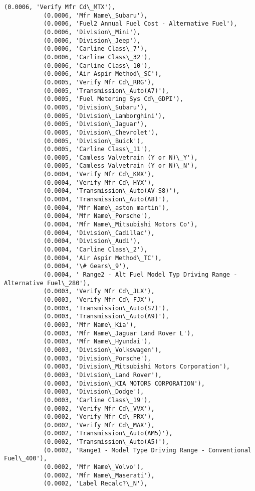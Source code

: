 \documentclass[11pt]{article}
\begin{document}
\begin{Verbatim}[commandchars=\\\{\}]
           (0.0006, 'Verify Mfr Cd\_MTX'),
           (0.0006, 'Mfr Name\_Subaru'),
           (0.0006, 'Fuel2 Annual Fuel Cost - Alternative Fuel'),
           (0.0006, 'Division\_Mini'),
           (0.0006, 'Division\_Jeep'),
           (0.0006, 'Carline Class\_7'),
           (0.0006, 'Carline Class\_32'),
           (0.0006, 'Carline Class\_10'),
           (0.0006, 'Air Aspir Method\_SC'),
           (0.0005, 'Verify Mfr Cd\_RRG'),
           (0.0005, 'Transmission\_Auto(A7)'),
           (0.0005, 'Fuel Metering Sys Cd\_GDPI'),
           (0.0005, 'Division\_Subaru'),
           (0.0005, 'Division\_Lamborghini'),
           (0.0005, 'Division\_Jaguar'),
           (0.0005, 'Division\_Chevrolet'),
           (0.0005, 'Division\_Buick'),
           (0.0005, 'Carline Class\_11'),
           (0.0005, 'Camless Valvetrain (Y or N)\_Y'),
           (0.0005, 'Camless Valvetrain (Y or N)\_N'),
           (0.0004, 'Verify Mfr Cd\_KMX'),
           (0.0004, 'Verify Mfr Cd\_HYX'),
           (0.0004, 'Transmission\_Auto(AV-S8)'),
           (0.0004, 'Transmission\_Auto(A8)'),
           (0.0004, 'Mfr Name\_aston martin'),
           (0.0004, 'Mfr Name\_Porsche'),
           (0.0004, 'Mfr Name\_Mitsubishi Motors Co'),
           (0.0004, 'Division\_Cadillac'),
           (0.0004, 'Division\_Audi'),
           (0.0004, 'Carline Class\_2'),
           (0.0004, 'Air Aspir Method\_TC'),
           (0.0004, '\# Gears\_9'),
           (0.0004, ' Range2 - Alt Fuel Model Typ Driving Range - Alternative Fuel\_280'),
           (0.0003, 'Verify Mfr Cd\_JLX'),
           (0.0003, 'Verify Mfr Cd\_FJX'),
           (0.0003, 'Transmission\_Auto(S7)'),
           (0.0003, 'Transmission\_Auto(A9)'),
           (0.0003, 'Mfr Name\_Kia'),
           (0.0003, 'Mfr Name\_Jaguar Land Rover L'),
           (0.0003, 'Mfr Name\_Hyundai'),
           (0.0003, 'Division\_Volkswagen'),
           (0.0003, 'Division\_Porsche'),
           (0.0003, 'Division\_Mitsubishi Motors Corporation'),
           (0.0003, 'Division\_Land Rover'),
           (0.0003, 'Division\_KIA MOTORS CORPORATION'),
           (0.0003, 'Division\_Dodge'),
           (0.0003, 'Carline Class\_19'),
           (0.0002, 'Verify Mfr Cd\_VVX'),
           (0.0002, 'Verify Mfr Cd\_PRX'),
           (0.0002, 'Verify Mfr Cd\_MAX'),
           (0.0002, 'Transmission\_Auto(AM5)'),
           (0.0002, 'Transmission\_Auto(A5)'),
           (0.0002, 'Range1 - Model Type Driving Range - Conventional Fuel\_400'),
           (0.0002, 'Mfr Name\_Volvo'),
           (0.0002, 'Mfr Name\_Maserati'),
           (0.0002, 'Label Recalc?\_N'),

\end{Verbatim}
\end{document}
